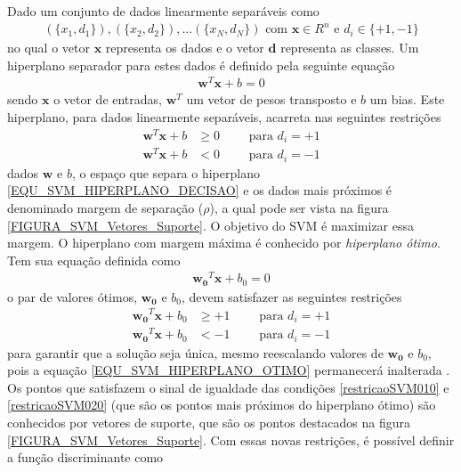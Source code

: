 Dado um conjunto de dados linearmente separáveis como
\begin{align}
(\{x_{1}, d_{1}\}), (\{x_{2}, d_{2}\}), \ldots (\{x_{N}, d_{N}\}) \text{ com } \mathbf{x} \in R^{n} \text{ e } d_{i} \in \{+1, -1\}
\end{align}
no qual o vetor \(\mathbf{x}\) representa os dados e o vetor \(\mathbf{d}\) representa as classes. Um hiperplano separador para estes dados é definido pela seguinte equação
\begin{align}
\mathbf{w}^{T}\mathbf{x} + b = 0 		\label{EQU_SVM_HIPERPLANO_DECISAO}
\end{align}
sendo \(\mathbf{x}\) o vetor de entradas, \(\mathbf{w}^{T}\) um vetor de pesos transposto e \(b\) um bias. Este hiperplano, para dados linearmente separáveis, acarreta nas seguintes restrições
\begin{align}
\mathbf{w}^{T}\mathbf{x} + b &\geq 0  	\qquad \textrm{ para } d_{i} = +1 \label{restricaoSVM01} \\
\mathbf{w}^{T}\mathbf{x} + b &< 0		\qquad \textrm{ para } d_{i} = -1 \label{restricaoSVM02}
\end{align}
dados \(\mathbf{w}\) e \(b\), o espaço que separa o hiperplano \eqref{EQU_SVM_HIPERPLANO_DECISAO} e os dados mais próximos é denominado margem de separação (\(\rho\)), a qual pode ser vista na figura \ref{FIGURA_SVM_Vetores_Suporte}. O objetivo do SVM é maximizar essa margem. O hiperplano com margem máxima é conhecido por \emph{hiperplano ótimo}. Tem sua equação definida como
\begin{align}
\mathbf{w_{0}}^{T}\mathbf{x} + b_{0} = 0 								\label{EQU_SVM_HIPERPLANO_OTIMO}
\end{align}
o par de valores ótimos, \(\mathbf{w_{0}}\) e \(b_{0}\), devem satisfazer as seguintes restrições
\begin{align}
\mathbf{w_{0}}^{T}\mathbf{x} + b_{0} &\geq +1  	\qquad \textrm{ para } d_{i} = +1 \label{restricaoSVM010} \\
\mathbf{w_{0}}^{T}\mathbf{x} + b_{0} &< -1		\qquad \textrm{ para } d_{i} = -1 \label{restricaoSVM020}
\end{align}
para garantir que a solução seja única, mesmo reescalando valores de \(\mathbf{w_{0}}\) e \(b_{0}\), pois a equação \eqref{EQU_SVM_HIPERPLANO_OTIMO} permanecerá inalterada \cite{LIMA2004}. Os pontos que satisfazem o sinal de igualdade das condições \eqref{restricaoSVM010} e \eqref{restricaoSVM020} (que são os pontos mais próximos do hiperplano ótimo) são conhecidos por vetores de suporte, que são os pontos destacados na figura \ref{FIGURA_SVM_Vetores_Suporte}. Com essas novas restrições, é possível definir a função discriminante como
